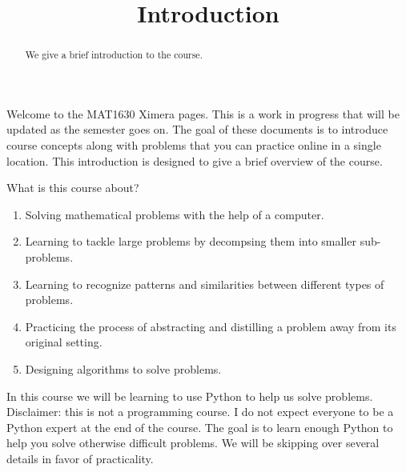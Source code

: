 \documentclass{ximera}
\title{Introduction}
\begin{document}
  
\begin{abstract}  
We give a brief introduction to the course.
\end{abstract}  
\maketitle

Welcome to the MAT1630 Ximera pages. This is a work in progress that will be updated as the semester goes on. The goal of these documents is to introduce course concepts along with problems that you can practice online in a single location. 
This introduction is designed to give a brief overview of the course.

What is this course about?

\begin{enumerate}
	\item Solving mathematical problems with the help of a computer.
	\item Learning to tackle large problems by decompsing them into smaller sub-problems.
	\item Learning to recognize patterns and similarities between different types of problems.
	\item Practicing the process of abstracting and distilling a problem away from its original setting.
	\item Designing algorithms to solve problems.
\end{enumerate}

In this course we will be learning to use Python to help us solve problems. Disclaimer: this is not a programming course. I do not expect everyone to be a Python expert at the end of the course. The goal is to learn enough Python to help you solve otherwise difficult problems. We will be skipping over several details in favor of practicality. 
\end{document}
